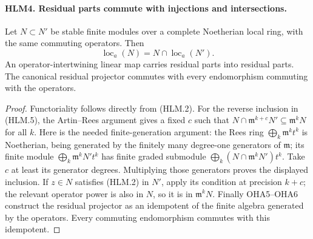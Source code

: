 \paragraph{HLM4. Residual parts commute with injections and intersections.}
\label{claim:HLM4}
Let \(N\subset N'\) be stable finite modules over a complete
Noetherian local ring, with the same commuting operators.
Then
\[
       \operatorname{loc}_a(N)=N\cap\operatorname{loc}_a(N').
 \tag{HLM.5}
\]
An operator-intertwining linear map carries residual parts into
residual parts.  The canonical residual projector commutes with
every endomorphism commuting with the operators.
\begin{proof}
Functoriality follows directly from (HLM.2).  For the reverse
inclusion in (HLM.5), the Artin--Rees argument gives a fixed
\(c\) such that
\(N\cap\mathfrak m^{k+c}N'\subseteq\mathfrak m^kN\)
for all \(k\).  Here is the needed finite-generation argument:
the Rees ring \(\bigoplus_k\mathfrak m^kt^k\) is Noetherian,
being generated by the finitely many degree-one generators of
\(\mathfrak m\); its finite module
\(\bigoplus_k\mathfrak m^kN't^k\) has finite graded submodule
\(\bigoplus_k(N\cap\mathfrak m^kN')t^k\).
Take \(c\) at least its generator degrees.  Multiplying those
generators proves the displayed inclusion.  If \(z\in N\)
satisfies (HLM.2) in \(N'\), apply its condition at precision
\(k+c\); the relevant operator power is also in \(N\),
so it is in \(\mathfrak m^kN\).
Finally OHA5--OHA6 construct the residual projector as an
idempotent of the finite algebra generated by the operators.
Every commuting endomorphism commutes with this idempotent.
\end{proof}

